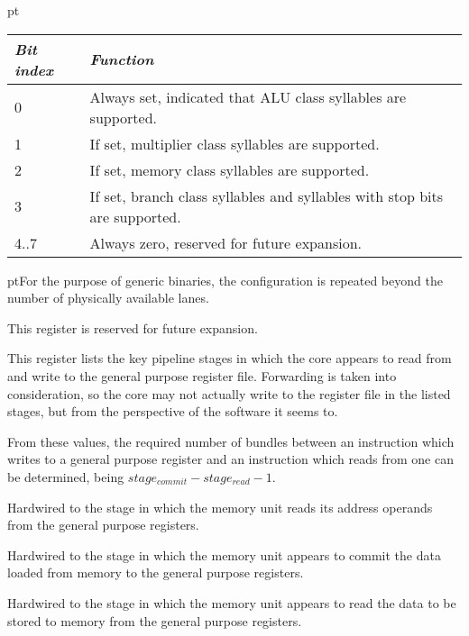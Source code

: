  pt\noindent\begin{tabular}{|l|p{12cm}|}
\hline
\emph{Bit index} & \emph{Function} \\
\hline
0 & Always set, indicated that ALU class syllables are supported. \\
\hline
1 & If set, multiplier class syllables are supported. \\
\hline
2 & If set, memory class syllables are supported. \\
\hline
3 & If set, branch class syllables and syllables with stop bits are supported. \\
\hline
4..7 & Always zero, reserved for future expansion. \\
\hline
\end{tabular}

 pt\noindent For the purpose of generic binaries, the configuration is 
repeated beyond the number of physically available lanes.


This register is reserved for future expansion.


This register lists the key pipeline stages in which the core appears to read
from and write to the general purpose register file. Forwarding is taken into
consideration, so the core may not actually write to the register file in the
listed stages, but from the perspective of the software it seems to.

From these values, the required number of bundles between an instruction which
writes to a general purpose register and an instruction which reads from one can
be determined, being $stage_{commit} - stage_{read} - 1$.

\reset{****}
Hardwired to the stage in which the memory unit reads its address operands from
the general purpose registers.

\reset{****}
Hardwired to the stage in which the memory unit appears to commit the data
loaded from memory to the general purpose registers.

\reset{****}
Hardwired to the stage in which the memory unit appears to read the data to be
stored to memory from the general purpose registers.

